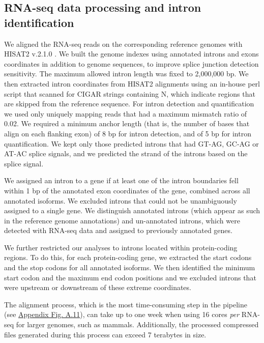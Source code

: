 \subsection{RNA-seq data processing and intron identification}
We aligned the RNA-seq reads on the corresponding reference genomes with HISAT2 v.2.1.0 \citep{kim_graph-based_2019}. We built the genome indexes using annotated introns and exons coordinates in addition to genome sequences, to improve splice junction detection sensitivity. The maximum allowed intron length was fixed to 2,000,000 bp. We then extracted intron coordinates from HISAT2 alignments using an in-house perl script that scanned for CIGAR strings containing N, which indicate regions that are skipped from the reference sequence. For intron detection and quantification we used only uniquely mapping reads that had a maximum mismatch ratio of 0.02. We required a minimum anchor length (that is, the number of bases that align on each flanking exon) of 8 bp for intron detection, and of 5 bp for intron quantification. We kept only those predicted introns that had GT-AG, GC-AG or AT-AC splice signals, and we predicted the strand of the introns based on the splice signal. 


We assigned an intron to a gene if at least one of the intron boundaries fell within 1 bp of the annotated exon coordinates of the gene, combined across all annotated isoforms. We excluded introns that could not be unambiguously assigned to a single gene. We distinguish annotated introns (which appear as such in the reference genome annotations) and un-annotated introns, which were detected with RNA-seq data and assigned to previously annotated genes. 

We further restricted our analyses to introns located within protein-coding regions. To do this, for each protein-coding gene, we extracted the start codons and the stop codons for all annotated isoforms. We then identified the minimum start codon and the maximum end codon positions and we excluded introns that were upstream or downstream of these extreme coordinates.

The alignment process, which is the most time-consuming step in the pipeline (see \hyperref[supp_fig:AS11]{Appendix Fig. A.11}), can take up to one week when using 16 cores \textit{per} RNA-seq for larger genomes, such as mammals. Additionally, the processed compressed files generated during this process can exceed 7 terabytes in size.

